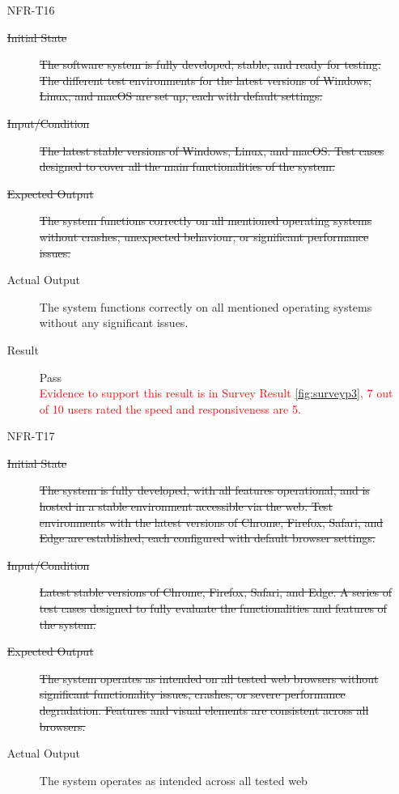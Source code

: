 \documentclass[12pt, titlepage]{article}
\newcommand{\rt}[1]{\textcolor{red}{#1}}
\begin{document}
  \begin{enumerate}
    \item[NFR-T16] \label{NFRT16}
      \begin{description}
      \item[\sout{Initial State}]\sout{ The software system is fully developed, stable, and ready
        for testing. The different test environments for the latest versions of
        Windows, Linux, and macOS are set up, each with default settings.
      }
      \item[\sout{Input/Condition}]\sout{ The latest stable versions of Windows, Linux, and
        macOS. Test cases designed to cover all the main functionalities of the
        system.
      }
      \item[\sout{Expected Output}]\sout{ The system functions correctly on all mentioned
        operating systems without crashes, unexpected behaviour, or significant
        performance issues.
      }
      \item[Actual Output] The system functions correctly on all mentioned operating
        systems without any significant issues.
      \item[Result] Pass \\
      \rt{ Evidence to support this result is in Survey Result \ref{fig:surveyp3}, 7 out of 10 users rated the speed and responsiveness are 5. }
      \end{description}
    \item[NFR-T17] \label{NFRT17}
      \begin{description}
      \item[\sout{Initial State}]\sout{ The system is fully developed, with all features
        operational, and is hosted in a stable environment accessible via the web.
        Test environments with the latest versions of Chrome, Firefox, Safari, and
        Edge are established, each configured with default browser settings.
      }
      \item[\sout{Input/Condition}]\sout{ Latest stable versions of Chrome, Firefox, Safari, and
        Edge. A series of test cases designed to fully evaluate the
        functionalities and features of the system.
      }
      \item[\sout{Expected Output}]\sout{ The system operates as intended on all tested web
        browsers without significant functionality issues, crashes, or severe
        performance degradation. Features and visual elements are consistent across
        all browsers.
      }
      \item[Actual Output] The system operates as intended across all tested web

\end{description}
\end{enumerate}
\end{document}
